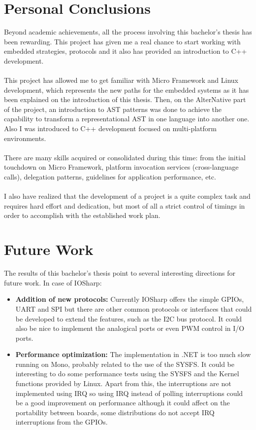 \section{Personal Conclusions}\label{S:Personal-Conclusions}
Beyond academic achievements, all the process involving this bachelor's thesis has been rewarding. This project has given me a real chance to start working with embedded strategies, protocols and it also has provided an introduction to C++ development.
\\
\\
This project has allowed me to get familiar with Micro Framework and Linux development, which represents the new paths for the embedded systems as it has been explained on the introduction of this thesis. Then, on the AlterNative part of the project, an introduction to AST patterns was done to achieve the capability to transform a representational AST in one language into another one. Also I was introduced to C++ development focused on multi-platform environments.
\\
\\
There are many skills acquired or consolidated during this time: from the initial touchdown on Micro Framework, platform invocation services (cross-language calls), delegation patterns, guidelines for application performance, etc.
\\
\\
I also have realized that the development of a project is a quite complex task and requires hard effort and dedication, but most of all a strict control of timings in order to accomplish with the established work plan.

\section{Future Work}\label{S:Future-Work}
The results of this bachelor's thesis point to several interesting directions for future work.
In case of IOSharp:
\begin{itemize}
\item \textbf{Addition of new protocols:} Currently IOSharp offers the simple GPIOs, UART and SPI but there are other common protocols or interfaces that could be developed to extend the features, such as the \gls{I2C} bus protocol. It could also be nice to implement the analogical ports or even \gls{PWM} control in I/O ports.

\item \textbf{Performance optimization:} The implementation in .NET is too much slow running on Mono, probably related to the use of the \gls{SYSFS}. It could be interesting to do some performance tests using the \gls{SYSFS} and the Kernel functions provided by Linux. Apart from this, the interruptions are not implemented using \gls{IRQ} so using \gls{IRQ} instead of polling interruptions could be a good improvement on performance although it could affect on the portability between boards, some distributions do not accept IRQ interruptions from the GPIOs.
\end{itemize}

